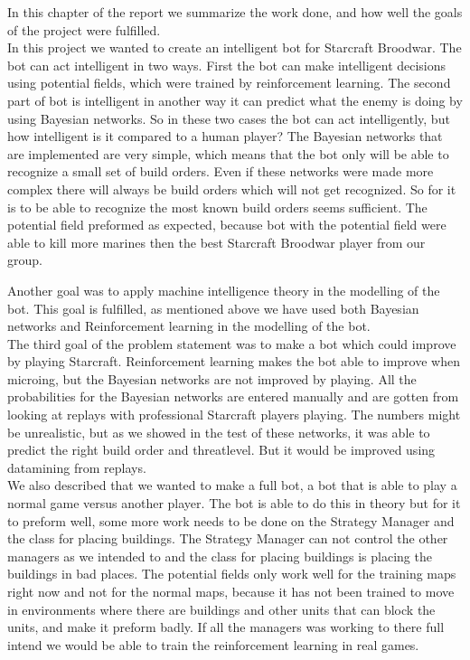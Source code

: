 In this chapter of the report we summarize the work done, and how well the goals of the project were fulfilled. \\

In this project we wanted to create an intelligent bot for Starcraft Broodwar. The bot can act intelligent in two ways. First the bot can make intelligent decisions using potential fields, which were trained by reinforcement learning. The second part of bot is intelligent in another way  it can predict what the enemy is doing by using Bayesian networks. 
So in these two cases the bot can act intelligently, but how intelligent is it compared to a human player? The Bayesian networks that are implemented are very simple, which means that the bot only will be able to recognize a small set of build orders. Even if these networks were made more complex there will always be build orders which will not get recognized. So for it is to be able to recognize the most known build orders seems sufficient. The potential field preformed as expected, because bot with the potential field were able to kill more marines then the best Starcraft Broodwar player from our group.

Another goal was to apply machine intelligence theory in the modelling of the bot. This goal is fulfilled, as mentioned above we have used both 
Bayesian networks and Reinforcement learning in the modelling of the bot.\\

The third goal of the problem statement was to make a bot which could improve by playing Starcraft. 
Reinforcement learning makes the bot able to improve when microing, but the Bayesian networks are not improved by playing. All the probabilities for the Bayesian networks are entered manually and are gotten from looking at replays with professional Starcraft players playing. The numbers might be unrealistic, but as we showed in the test of these networks, it was able to predict the right build order and threatlevel. But it would be improved using datamining from replays. \\

We also described that we wanted to make a full bot, a bot that is able to play a normal game versus another player. The bot is able to do this in theory but for it to preform well, some more work needs to be done on the Strategy Manager and the class for placing buildings. The Strategy Manager can not control the other managers as we intended to and the class for placing buildings is placing the buildings in bad places. The potential fields only work well for the training maps right now and not for the normal maps, because it has not been trained to move in environments where there are buildings and other units that can block the units, and make it preform badly. If all the managers was working to there full intend we would be able to train the reinforcement learning in real games.
